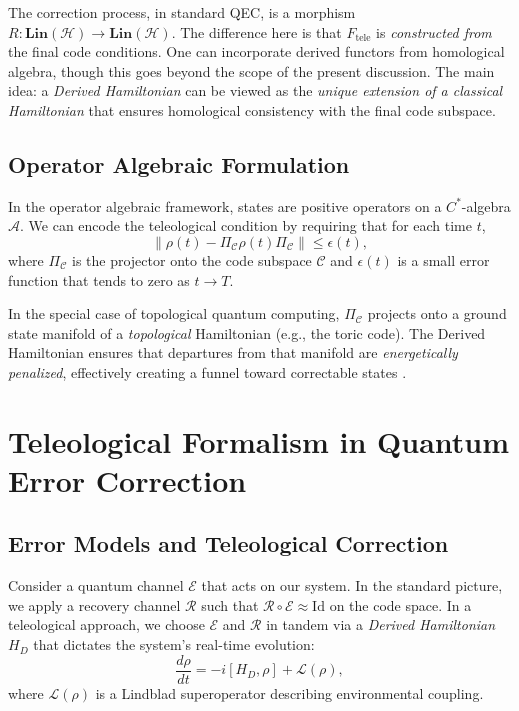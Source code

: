 \documentclass[11pt]{article}
\begin{document}
The correction process, in standard QEC, is a morphism $R: \mathbf{Lin}(\mathcal{H}) \to \mathbf{Lin}(\mathcal{H})$. The difference here is that $F_{\mathrm{tele}}$ is \emph{constructed from} the final code conditions. One can incorporate derived functors from homological algebra, though this goes beyond the scope of the present discussion. The main idea: a \emph{Derived Hamiltonian} can be viewed as the \emph{unique extension of a classical Hamiltonian} that ensures homological consistency with the final code subspace.

\subsection{Operator Algebraic Formulation}
In the operator algebraic framework, states are positive operators on a $C^*$-algebra $\mathcal{A}$. We can encode the teleological condition by requiring that for each time $t$,
\begin{equation}
\|\rho(t) - \Pi_{\mathcal{C}} \rho(t) \Pi_{\mathcal{C}} \| \leq \epsilon(t),
\end{equation}
where $\Pi_{\mathcal{C}}$ is the projector onto the code subspace $\mathcal{C}$ and $\epsilon(t)$ is a small error function that tends to zero as $t \to T$. 

In the special case of topological quantum computing, $\Pi_{\mathcal{C}}$ projects onto a ground state manifold of a \emph{topological} Hamiltonian (e.g., the toric code). The Derived Hamiltonian ensures that departures from that manifold are \emph{energetically penalized}, effectively creating a funnel toward correctable states \cite{Freedman}.

\section{Teleological Formalism in Quantum Error Correction}
\subsection{Error Models and Teleological Correction}
Consider a quantum channel $\mathcal{E}$ that acts on our system. In the standard picture, we apply a recovery channel $\mathcal{R}$ such that $\mathcal{R} \circ \mathcal{E} \approx \mathrm{Id}$ on the code space. In a teleological approach, we choose $\mathcal{E}$ and $\mathcal{R}$ in tandem via a \emph{Derived Hamiltonian} $H_D$ that dictates the system’s real-time evolution:
\begin{equation}
\frac{d\rho}{dt} = -i [H_D, \rho] + \mathcal{L}(\rho),
\end{equation}
where $\mathcal{L}(\rho)$ is a Lindblad superoperator describing environmental coupling.
\end{document}
